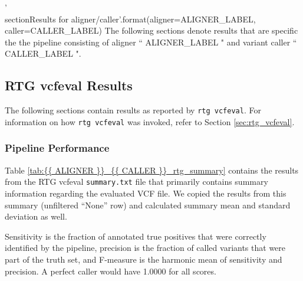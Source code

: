 {{ '\\section{{Results for {aligner}/{caller}}}'.format(aligner=ALIGNER_LABEL, caller=CALLER_LABEL) }}
The following sections denote results that are specific the the pipeline consisting of aligner ``{{ ALIGNER_LABEL }}" and variant caller ``{{ CALLER_LABEL }}".

\subsection{RTG vcfeval Results}
The following sections contain results as reported by \texttt{rtg vcfeval}. 
For information on how \texttt{rtg vcfeval} was invoked, refer to Section \ref{sec:rtg_vcfeval}.

\subsubsection{Pipeline Performance}
Table \ref{tab:{{ ALIGNER }}_{{ CALLER }}_rtg_summary} contains the results from the RTG vcfeval \texttt{summary.txt} file that primarily contains summary information regarding the evaluated VCF file. 
We copied the results from this summary (unfiltered ``None'' row) and calculated summary mean and standard deviation as well.

Sensitivity is the fraction of annotated true positives that were correctly identified by the pipeline, 
precision is the fraction of called variants that were part of the truth set, 
and F-measure is the harmonic mean of sensitivity and precision. 
A perfect caller would have 1.0000 for all scores.

